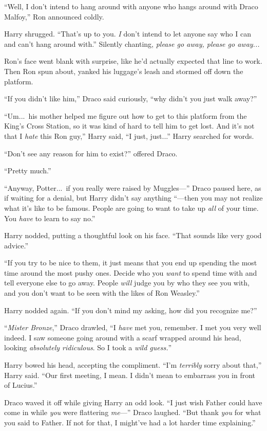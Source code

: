 “Well, I don’t intend to hang around with anyone who hangs around with Draco Malfoy,” Ron announced coldly.

Harry shrugged. “That’s up to you. \emph{I} don’t intend to let anyone say who I can and can’t hang around with.” Silently chanting, \emph{please go away, please go away...}

Ron’s face went blank with surprise, like he’d actually expected that line to work. Then Ron spun about, yanked his luggage’s leash and stormed off down the platform.

“If you didn’t like him,” Draco said curiously, “why didn’t you just walk away?”

“Um...\ his mother helped me figure out how to get to this platform from the King’s Cross Station, so it was kind of hard to tell him to get lost. And it’s not that I \emph{hate} this Ron guy,” Harry said, “I just, just...” Harry searched for words.

“Don’t see any reason for him to exist?” offered Draco.

“Pretty much.”

“Anyway, Potter...\ if you really were raised by Muggles—” Draco paused here, as if waiting for a denial, but Harry didn’t say anything “—then you may not realize what it’s like to be famous. People are going to want to take up \emph{all} of your time. You \emph{have} to learn to say no.”

Harry nodded, putting a thoughtful look on his face. “That sounds like very good advice.”

“If you try to be nice to them, it just means that you end up spending the most time around the most pushy ones. Decide who you \emph{want} to spend time with and tell everyone else to go away. People \emph{will} judge you by who they see you with, and you don’t want to be seen with the likes of Ron Weasley.”

Harry nodded again. “If you don’t mind my asking, how did you recognize me?”

“\emph{Mister Bronze},” Draco drawled, “I \emph{have} met you, remember. I met you very well indeed. I saw someone going around with a scarf wrapped around his head, looking \emph{absolutely ridiculous}. So I took a \emph{wild guess.}”

Harry bowed his head, accepting the compliment. “I’m \emph{terribly} sorry about that,” Harry said. “Our first meeting, I mean. I didn’t mean to embarrass you in front of Lucius.”

Draco waved it off while giving Harry an odd look. “I just wish Father could have come in while \emph{you} were flattering \emph{me}—” Draco laughed. “But thank \emph{you} for what you said to Father. If not for that, I might’ve had a lot harder time explaining.”

